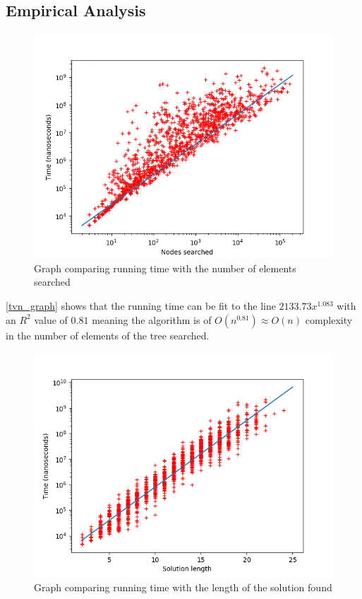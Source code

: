 \documentclass[10pt]{article}
\begin{document}
\subsection{Empirical Analysis}
\graphicspath{ {TestData/} }
\begin{figure}[ht]
  \includegraphics[width=\linewidth]{time_vs_nodes}
  \caption{Graph comparing running time with the number of elements searched}
  \label{tvn_graph}
\end{figure}
\autoref{tvn_graph} shows that the running time can be fit to the line $2133.73x^{1.083}$ with an $R^2$ value of $0.81$ meaning the algorithm is of $O(n^{0.81}) \approx O(n)$ complexity in the number of elements of the tree searched.
\newpage
\begin{figure}[ht]
	\includegraphics[width=\linewidth]{time_vs_length}
	\caption{Graph comparing running time with the length of the solution found}
	\label{tvl_graph}
\end{figure}
\end{document}
